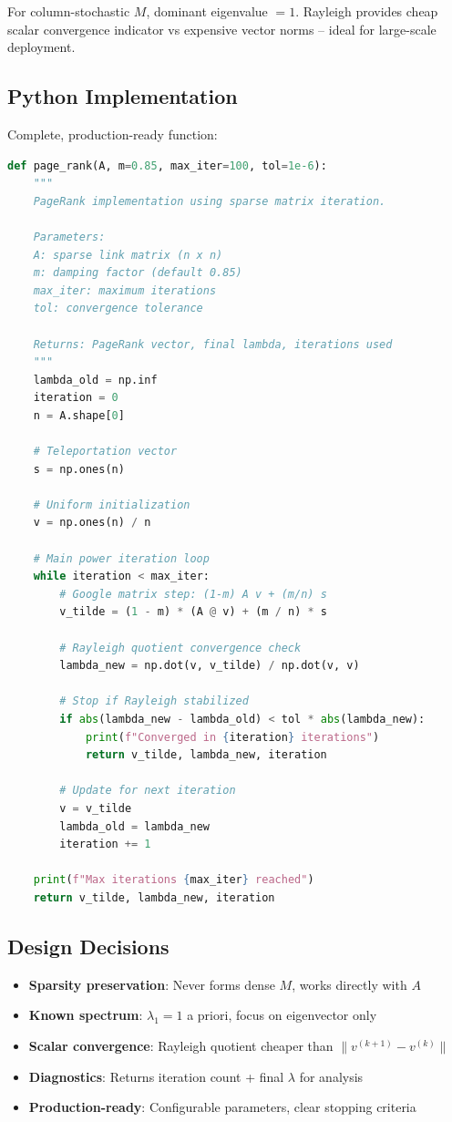 \documentclass[11pt]{article}
\begin{document}
For column-stochastic $M$, dominant eigenvalue $=1$. Rayleigh provides cheap scalar convergence indicator vs expensive vector norms -- ideal for large-scale deployment.

\subsection{Python Implementation}

Complete, production-ready function:

\begin{lstlisting}[language=Python, basicstyle=\footnotesize\ttfamily, frame=single]
def page_rank(A, m=0.85, max_iter=100, tol=1e-6):
    """
    PageRank implementation using sparse matrix iteration.
    
    Parameters:
    A: sparse link matrix (n x n)
    m: damping factor (default 0.85)
    max_iter: maximum iterations
    tol: convergence tolerance
    
    Returns: PageRank vector, final lambda, iterations used
    """
    lambda_old = np.inf
    iteration = 0
    n = A.shape[0]
    
    # Teleportation vector
    s = np.ones(n)
    
    # Uniform initialization 
    v = np.ones(n) / n
    
    # Main power iteration loop
    while iteration < max_iter:
        # Google matrix step: (1-m) A v + (m/n) s
        v_tilde = (1 - m) * (A @ v) + (m / n) * s
        
        # Rayleigh quotient convergence check
        lambda_new = np.dot(v, v_tilde) / np.dot(v, v)
        
        # Stop if Rayleigh stabilized
        if abs(lambda_new - lambda_old) < tol * abs(lambda_new):
            print(f"Converged in {iteration} iterations")
            return v_tilde, lambda_new, iteration
        
        # Update for next iteration
        v = v_tilde
        lambda_old = lambda_new
        iteration += 1
    
    print(f"Max iterations {max_iter} reached")
    return v_tilde, lambda_new, iteration
\end{lstlisting}

\subsection{Design Decisions}

\begin{itemize}
\item \textbf{Sparsity preservation}: Never forms dense $M$, works directly with $A$
\item \textbf{Known spectrum}: $\lambda_1=1$ a priori, focus on eigenvector only
\item \textbf{Scalar convergence}: Rayleigh quotient cheaper than $\|v^{(k+1)}-v^{(k)}\|$
\item \textbf{Diagnostics}: Returns iteration count + final $\lambda$ for analysis
\item \textbf{Production-ready}: Configurable parameters, clear stopping criteria
\end{itemize}
\end{document}
